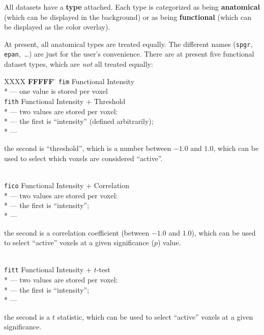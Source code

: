     All datasets have a {\bf type} attached.  Each type is categorized
    as being {\bf anatomical} (which can be displayed in the background)
    or as being {\bf functional} (which can be displayed as the color overlay).

\vset

    At present, all anatomical types are treated equally.  The different
    names ({\tt spgr}, {\tt epan},~\ldots) are just for the user's convenience.
    There are at present five functional dataset types, which are {\it not\/}
    all treated equally:
\begin{tabbing}
   XXXX \= {\bf FFFFF} \= \kill
        \> {\tt fim}   \> Functional Intensity \\*
        \>             \> --- one value is stored per voxel \\[1ex]
%
        \> {\tt fith}  \> Functional Intensity + Threshold\\*
        \>             \> --- two values are stored per voxel: \\*
        \>             \> --- the first is ``intensity'' (defined arbitrarily); \\*
        \>             \> --- \parbox[t]{4.5in}{
                              the second is ``threshold'',
                              which is a number between $-1.0$ and $1.0$,
                              which can be used to select which
                              voxels are considered ``active''.} \\[1ex]
%
        \> {\tt fico}  \> Functional Intensity + Correlation\\*
        \>             \> --- two values are stored per voxel:\\*
        \>             \> --- the first is ``intensity''; \\*
        \>             \> --- \parbox[t]{4.5in}{
                              the second is a correlation coefficient
                              (between $-1.0$ and $1.0$),
                              which can be used to select ``active'' voxels
                              at a given significance ($p$) value.}\\[1ex]

        \> {\tt fitt} \> Functional Intensity + $t$-test\\*
        \>             \> --- two values are stored per voxel:\\*
        \>             \> --- the first is ``intensity''; \\*
        \>             \> --- \parbox[t]{4.5in}{
                              the second is a $t$ statistic, which
                              can be used to select ``active'' voxels
                              at a given significance.}\\[1ex]


\end{tabbing}

